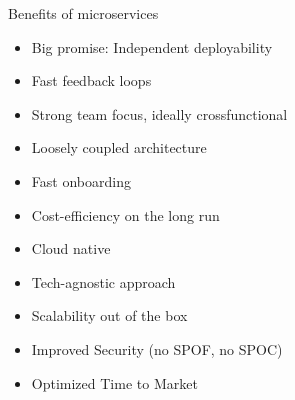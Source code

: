 \begin{frame}{Benefits of microservices}
            \begin{itemize}[<+->]
            \item Big promise: Independent deployability
            \item Fast feedback loops
            \item Strong team focus, ideally crossfunctional
            \item Loosely coupled architecture
            \item Fast onboarding
            \item Cost-efficiency on the long run
            \item Cloud native
            \item Tech-agnostic approach
            \item Scalability out of the box
            \item Improved Security (no SPOF, no SPOC)
            \item Optimized Time to Market
            \end{itemize}
\end{frame}

